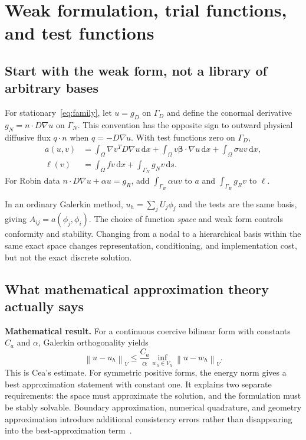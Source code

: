 \documentclass[11pt,a4paper]{article}
\newcommand{\dd}{\,\mathrm{d}}
\newcommand{\norm}[1]{\left\lVert #1\right\rVert}
\newcommand{\guarantee}{\textcolor{accent}{\textbf{Mathematical result.}} }
\begin{document}
\section{Weak formulation, trial functions, and test functions}\label{sec:spaces}
\subsection{Start with the weak form, not a library of arbitrary bases}
For stationary~\eqref{eq:family}, let $u=g_D$ on $\Gamma_D$ and define the conormal derivative $g_N=n\cdot D\nabla u$ on $\Gamma_N$. This convention has the opposite sign to outward physical diffusive flux $q\cdot n$ when $q=-D\nabla u$. With test functions zero on $\Gamma_D$,
\begin{align}
a(u,v)&=\int_\Omega\nabla v^TD\nabla u\dd x
+\int_\Omega v\boldsymbol\beta\cdot\nabla u\dd x
+\int_\Omega\sigma uv\dd x,\\
\ell(v)&=\int_\Omega fv\dd x+\int_{\Gamma_N}g_Nv\dd s.
\end{align}
For Robin data $n\cdot D\nabla u+\alpha u=g_R$, add $\int_{\Gamma_R}\alpha uv$ to $a$ and $\int_{\Gamma_R}g_Rv$ to $\ell$.

In an ordinary Galerkin method, $u_h=\sum_j U_j\phi_j$ and the tests are the same basis, giving $A_{ij}=a(\phi_j,\phi_i)$. The choice of function \emph{space} and weak form controls conformity and stability. Changing from a nodal to a hierarchical basis within the same exact space changes representation, conditioning, and implementation cost, but not the exact discrete solution.

\subsection{What mathematical approximation theory actually says}
\guarantee For a continuous coercive bilinear form with constants $C_a$ and $\alpha$, Galerkin orthogonality yields
\begin{equation}\label{eq:cea}
\norm{u-u_h}_V\le\frac{C_a}{\alpha}
\inf_{w_h\in V_h}\norm{u-w_h}_V.
\end{equation}
This is Cea's estimate. For symmetric positive forms, the energy norm gives a best approximation statement with constant one. It explains two separate requirements: the space must approximate the solution, and the formulation must be stably solvable. Boundary approximation, numerical quadrature, and geometry approximation introduce additional consistency errors rather than disappearing into the best-approximation term~\cite{femconvergence,ern2}.
\end{document}
